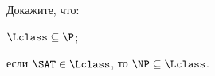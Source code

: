Докажите, что:
\begin{enumcyr}
    \item $\Lclass \subseteq \P$;
    \item если $\SAT \in \Lclass$, то $\NP \subseteq \Lclass$.
\end{enumcyr}